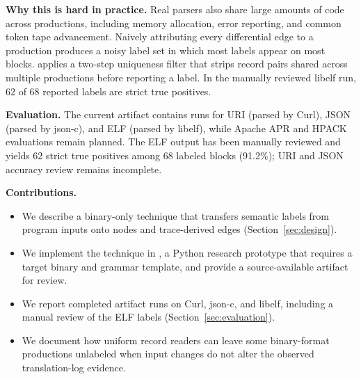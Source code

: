 \textbf{Why this is hard in practice.}
Real parsers also share large amounts of code across productions, including memory allocation, error reporting, and common token tape advancement.
Naively attributing every differential edge to a production produces a noisy label set in which most labels appear on most blocks.
\toolname applies a two-step uniqueness filter that strips record pairs shared across multiple productions before reporting a label.
In the manually reviewed libelf run, 62 of 68 reported labels are strict true positives.

\textbf{Evaluation.}
The current artifact contains runs for URI (parsed by Curl), JSON (parsed by json-c), and ELF (parsed by libelf), while Apache APR and HPACK evaluations remain planned.
The ELF output has been manually reviewed and yields 62 strict true positives among 68 labeled blocks (91.2\%); URI and JSON accuracy review remains incomplete.

\textbf{Contributions.}
\begin{itemize}
    \item We describe a binary-only technique that transfers semantic labels from program inputs onto nodes and trace-derived edges (Section~\ref{sec:design}).
    \item We implement the technique in \toolname, a Python research prototype that requires a target binary and grammar template, and provide a source-available artifact for review.
    \item We report completed artifact runs on Curl, json-c, and libelf, including a manual review of the ELF labels (Section~\ref{sec:evaluation}).
    \item We document how uniform record readers can leave some binary-format productions unlabeled when input changes do not alter the observed translation-log evidence.
\end{itemize}
